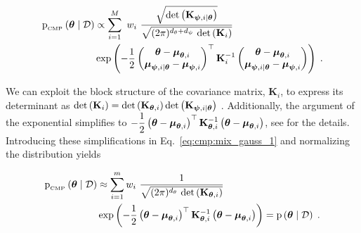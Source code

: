 \begin{equation}
    \left.
        \begin{aligned}
            \mathrm{p}_{_{\text{CMP}}} \left( \boldsymbol{\theta} \mid \mathcal{D} \right) &\propto \sum_{i=1}^{M} \ w_i \ \dfrac{\sqrt{\mathrm{det}\left(\mathbf{K}_{\boldsymbol{\psi},i \mid \boldsymbol{\theta}}\right)}}{\sqrt{(2\pi)^{d_\theta + d_\psi} \ \mathrm{det}\left(\mathbf{K}_i\right)}} \\
            & \exp\left( -\dfrac{1}{2}\begin{pmatrix}
                \boldsymbol{\theta} - \boldsymbol{\mu}_{\boldsymbol{\theta},i} \\
                \boldsymbol{\mu}_{\boldsymbol{\psi},i \mid \boldsymbol{\theta}} - \boldsymbol{\mu}_{\boldsymbol{\psi},i}
            \end{pmatrix}^{\top} \mathbf{K}_i^{-1} \begin{pmatrix}
                \boldsymbol{\theta} - \boldsymbol{\mu}_{\boldsymbol{\theta},i} \\
                \boldsymbol{\mu}_{\boldsymbol{\psi},i \mid \boldsymbol{\theta}} - \boldsymbol{\mu}_{\boldsymbol{\psi},i}
            \end{pmatrix}\right) \;.
        \end{aligned}
        \right.
    \label{eq:cmp:mix_gauss_1}
\end{equation}


We can exploit the block structure of the covariance matrix, $\mathbf{K}_{i}$, to express its determinant as $\mathrm{det}\left(\mathbf{K}_i\right) = \mathrm{det}\left(\mathbf{K}_{\boldsymbol{\theta},i}\right) \mathrm{det}\left(\mathbf{K}_{\boldsymbol{\psi},i \mid \boldsymbol{\theta}}\right)$ \cite{matrix_id}. Additionally, the argument of the exponential simplifies to $-\dfrac{1}{2} \left( \boldsymbol{\theta} - \boldsymbol{\mu}_{\boldsymbol{\theta},i} \right)^{\top} \mathbf{K}_{\boldsymbol{\theta},i}^{-1} \left( \boldsymbol{\theta} - \boldsymbol{\mu}_{\boldsymbol{\theta},i} \right)$, see \cite{fmp} for the details. Introducing these simplifications in Eq.~\eqref{eq:cmp:mix_gauss_1} and normalizing the distribution yields

\begin{equation}
    \left.
        \begin{aligned}
            \approxp{_\cmp}{\btheta \mid \data} &\approx \sum_{i=1}^{m} w_i \ \dfrac{1}{\sqrt{(2\pi)^{d_\theta} \ \detf{\mathbf{K}_{\btheta,i}}}} \\
            & \exp\left( -\dfrac{1}{2} \left( \btheta - \boldsymbol{\mu}_{\btheta,i} \right)^{\top} \mathbf{K}_{\btheta,i}^{-1} \left( \btheta - \boldsymbol{\mu}_{\btheta,i} \right) \right) = \p{\btheta \mid \data} \;.
        \end{aligned}
        \right.
    \label{eq:cmp:mix_gauss_2}
\end{equation}

